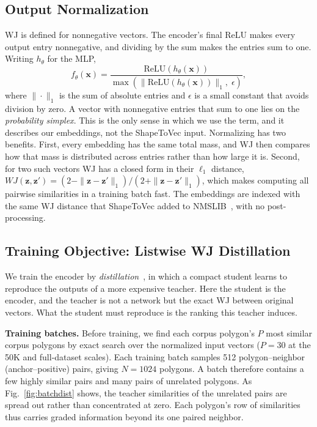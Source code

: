 \documentclass[conference]{IEEEtran}
\begin{document}
\subsection{Output Normalization}
\label{sec:simplex}
WJ is defined for nonnegative vectors. The encoder's final ReLU makes every output
entry nonnegative, and dividing by the sum makes the entries sum to one. Writing
$h_\theta$ for the MLP,
\begin{equation}
  f_\theta(\mathbf{x}) = \frac{\mathrm{ReLU}(h_\theta(\mathbf{x}))}
       {\max(\|\mathrm{ReLU}(h_\theta(\mathbf{x}))\|_1,\;\epsilon)},
  \label{eq:simplex}
\end{equation}
where $\|\cdot\|_1$ is the sum of absolute entries and $\epsilon$ is a small
constant that avoids division by zero. A vector with nonnegative entries that sum to
one lies on the \emph{probability simplex}. This is the only sense in which we use
the term, and it describes our embeddings, not the ShapeToVec input. Normalizing has
two benefits. First, every embedding has the same total mass, and WJ then compares
how that mass is distributed across entries rather than how large it is. Second,
for two such vectors WJ has a closed form in their $\ell_1$ distance,
$WJ(\mathbf{z},\mathbf{z}')=(2-\|\mathbf{z}-\mathbf{z}'\|_1)/(2+\|\mathbf{z}-\mathbf{z}'\|_1)$,
which makes computing all pairwise similarities in a training batch fast. The
embeddings are indexed with the same WJ distance that ShapeToVec added to
NMSLIB~\cite{shape2vec,boytsov13}, with no post-processing.

\subsection{Training Objective: Listwise WJ Distillation}
\label{sec:distill}
We train the encoder by \emph{distillation}~\cite{hinton15}, in which a compact
student learns to reproduce the outputs of a more expensive teacher. Here the student
is the encoder, and the teacher is not a network but the exact WJ between original
vectors. What the student must reproduce is the ranking this teacher induces.

\noindent\textbf{Training batches.} Before training, we find each corpus polygon's
$P$ most similar corpus polygons by exact search over the normalized input vectors
($P{=}30$ at the 50K and full-dataset scales). Each training batch samples 512
polygon--neighbor (anchor--positive) pairs, giving $N{=}1024$ polygons. A batch therefore contains a few
highly similar pairs and many pairs of unrelated polygons. As
Fig.~\ref{fig:batchdist} shows, the teacher similarities of the unrelated pairs are
spread out rather than concentrated at zero. Each polygon's row of similarities thus
carries graded information beyond its one paired neighbor.
\end{document}
